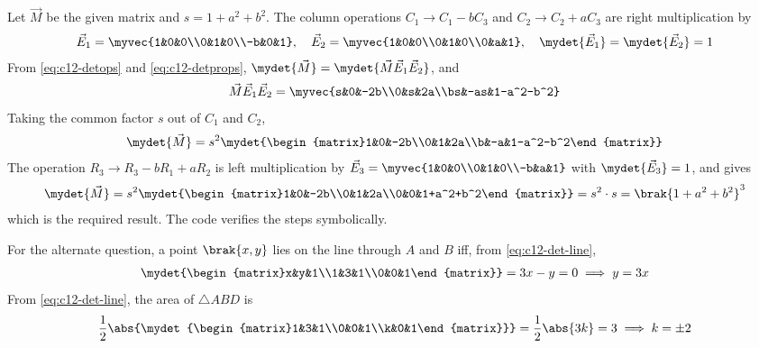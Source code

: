 \begin{enumerate}[label=\thesubsection.\arabic*., ref=\thesubsection.\theenumi]
\solution
Let $\vec{M}$ be the given matrix and $s=1+a^2+b^2$. The column operations $C_1\to C_1-bC_3$ and $C_2\to C_2+aC_3$ are right multiplication by
\begin{align}
\vec{E}_1 = \myvec{1&0&0\\0&1&0\\-b&0&1},\quad
\vec{E}_2 = \myvec{1&0&0\\0&1&0\\0&a&1},\quad
\mydet{\vec{E}_1}=\mydet{\vec{E}_2}=1
\end{align}
From \eqref{eq:c12-detops} and \eqref{eq:c12-detprops}, $\mydet{\vec{M}}=\mydet{\vec{M}\vec{E}_1\vec{E}_2}$, and
\begin{align}
\vec{M}\vec{E}_1\vec{E}_2 = \myvec{s&0&-2b\\0&s&2a\\bs&-as&1-a^2-b^2}
\end{align}
Taking the common factor $s$ out of $C_1$ and $C_2$,
\begin{align}
\mydet{\vec{M}} = s^2\mydet{\begin{matrix}1&0&-2b\\0&1&2a\\b&-a&1-a^2-b^2\end{matrix}}
\end{align}
The operation $R_3\to R_3-bR_1+aR_2$ is left multiplication by
$\vec{E}_3=\myvec{1&0&0\\0&1&0\\-b&a&1}$ with $\mydet{\vec{E}_3}=1$, and gives
\begin{align}
\mydet{\vec{M}} = s^2\mydet{\begin{matrix}1&0&-2b\\0&1&2a\\0&0&1+a^2+b^2\end{matrix}}
= s^2\cdot s = \brak{1+a^2+b^2}^3
\end{align}
which is the required result. The code verifies the steps symbolically.
 
For the alternate question, a point $\brak{x,y}$ lies on the line through $A$ and $B$ iff, from \eqref{eq:c12-det-line},
\begin{align}
\mydet{\begin{matrix}x&y&1\\1&3&1\\0&0&1\end{matrix}} = 3x-y = 0
\implies y=3x
\end{align}
From \eqref{eq:c12-det-line}, the area of $\triangle ABD$ is
\begin{align}
\frac{1}{2}\abs{\mydet{\begin{matrix}1&3&1\\0&0&1\\k&0&1\end{matrix}}}
= \frac{1}{2}\abs{3k} = 3
\implies k=\pm 2
\end{align}
 

\end{enumerate}
